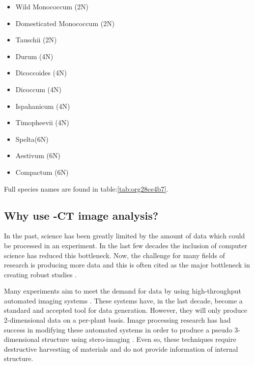 \documentclass[11pt]{report}
\begin{document}
\begin{multicols}{3}

  \begin{itemize}
  \item Wild Monococcum (2N)
  \item Domesticated Monococcum (2N)
  \item Tauschii (2N)
  \end{itemize}

  \columnbreak

  \begin{itemize}
  \item Durum (4N)
  \item Dicoccoides (4N)
  \item Dicoccum (4N)
  \item Ispahanicum (4N)
  \item Timopheevii (4N)
  \end{itemize}

  \columnbreak

  \begin{itemize}
  \item Spelta(6N)
  \item Aestivum (6N)
  \item Compactum (6N)
  \end{itemize}

\end{multicols}
Full species names are found in table:\ref{tab:org28ce4b7}.

\subsection{Why use \textmu{}-CT image analysis?}
\label{sec:org2effde5}
In the past, science has been greatly limited by the amount of data which could be processed in an experiment. In the last few decades the inclusion of computer science has reduced this bottleneck. Now, the challenge for many fields of research is producing more data and this is often cited as the major bottleneck in creating robust studies \cite{Furbank2011}.

Many experiments aim to meet the demand for data by using high-throughput automated imaging systems \cite{Naumann2007,Prasanna2013,Humplik2015}. These systems have, in the last decade, become a standard and accepted tool for data generation. However, they will only produce 2-dimensional data on a per-plant basis. Image processing research has had success in modifying these automated systems in order to produce a pseudo 3-dimensional structure using stero-imaging \cite{Roussel2016}. Even so, these techniques require destructive harvesting of materials and do not provide information of internal structure.
\end{document}
